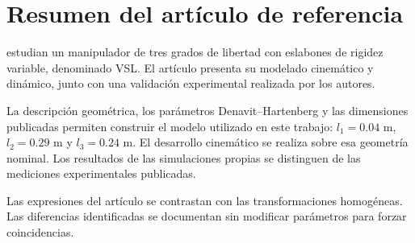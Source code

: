 \section{Resumen del artículo de referencia}
\textcite{ramzy2024} estudian un manipulador de tres grados de libertad con eslabones de rigidez variable, denominado VSL. El artículo presenta su modelado cinemático y dinámico, junto con una validación experimental realizada por los autores.

La descripción geométrica, los parámetros Denavit--Hartenberg y las dimensiones publicadas permiten construir el modelo utilizado en este trabajo: $l_1=0.04$ m, $l_2=0.29$ m y $l_3=0.24$ m. El desarrollo cinemático se realiza sobre esa geometría nominal. Los resultados de las simulaciones propias se distinguen de las mediciones experimentales publicadas.

Las expresiones del artículo se contrastan con las transformaciones homogéneas. Las diferencias identificadas se documentan sin modificar parámetros para forzar coincidencias.
